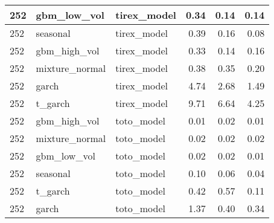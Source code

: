 {\begin{tabular}{lllrrr}
\midrule
252 & gbm\_low\_vol & tirex\_model & 0.34 & 0.14 & 0.14 \\
\midrule
252 & seasonal & tirex\_model & 0.39 & 0.16 & 0.08 \\
\midrule
252 & gbm\_high\_vol & tirex\_model & 0.33 & 0.14 & 0.16 \\
\midrule
252 & mixture\_normal & tirex\_model & 0.38 & 0.35 & 0.20 \\
\midrule
252 & garch & tirex\_model & 4.74 & 2.68 & 1.49 \\
\midrule
252 & t\_garch & tirex\_model & 9.71 & 6.64 & 4.25 \\
\midrule
252 & gbm\_high\_vol & toto\_model & 0.01 & 0.02 & 0.01 \\
\midrule
252 & mixture\_normal & toto\_model & 0.02 & 0.02 & 0.02 \\
\midrule
252 & gbm\_low\_vol & toto\_model & 0.02 & 0.02 & 0.01 \\
\midrule
252 & seasonal & toto\_model & 0.10 & 0.06 & 0.04 \\
\midrule
252 & t\_garch & toto\_model & 0.42 & 0.57 & 0.11 \\
\midrule
252 & garch & toto\_model & 1.37 & 0.40 & 0.34 \\
\bottomrule
\end{tabular}
}
